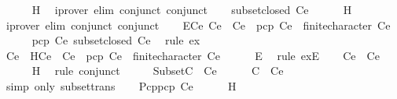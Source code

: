 \begin{isabellebody}
\ \ \ \ \isamarkupfalse%
\ H{}\ \isamarkupfalse%
\ {\isacharparenleft}iprover\ elim{\isacharcolon}\ conjunct{}\ conjunct{}{\isacharparenright}\isanewline
\ \ \isamarkupfalse%
\ {\isachardoublequoteopen}subset{\isacharunderscore}closed\ Ce{\isacharprime}{\isachardoublequoteclose}\isanewline
\ \ \ \ \isamarkupfalse%
\ H{}\ \isamarkupfalse%
\ {\isacharparenleft}iprover\ elim{\isacharcolon}\ conjunct{}\ conjunct{}{\isacharparenright}\isanewline
\ \ \isamarkupfalse%
\ E{}{\isacharcolon}{\isachardoublequoteopen}{\isasymexists}Ce{\isachardot}\ Ce{\isacharprime}\ {\isasymsubseteq}\ Ce\ {\isasymand}\ pcp\ Ce\ {\isasymand}\ finite{\isacharunderscore}character\ Ce{\isachardoublequoteclose}\isanewline
\ \ \ \ \isamarkupfalse%
\ {\isacartoucheopen}pcp\ Ce{\isacharprime}{\isacartoucheclose}\ {\isacartoucheopen}subset{\isacharunderscore}closed\ Ce{\isacharprime}{\isacartoucheclose}\ \isamarkupfalse%
\ {\isacharparenleft}rule\ ex{}{\isacharparenright}\isanewline
\ \ \isamarkupfalse%
\ Ce\ \ H{}{\isacharcolon}{\isachardoublequoteopen}Ce{\isacharprime}\ {\isasymsubseteq}\ Ce\ {\isasymand}\ pcp\ Ce\ {\isasymand}\ finite{\isacharunderscore}character\ Ce{\isachardoublequoteclose}\isanewline
\ \ \ \ \isamarkupfalse%
\ E{}\ \isamarkupfalse%
\ {\isacharparenleft}rule\ exE{\isacharparenright}\isanewline
\ \ \isamarkupfalse%
\ {\isachardoublequoteopen}Ce{\isacharprime}\ {\isasymsubseteq}\ Ce{\isachardoublequoteclose}\isanewline
\ \ \ \ \isamarkupfalse%
\ H{}\ \isamarkupfalse%
\ {\isacharparenleft}rule\ conjunct{}{\isacharparenright}\isanewline
\ \ \isamarkupfalse%
\ \isamarkupfalse%
\ Subset{\isacharcolon}{\isachardoublequoteopen}C\ {\isasymsubseteq}\ Ce{\isachardoublequoteclose}\isanewline
\ \ \ \ \isamarkupfalse%
\ {\isacartoucheopen}C\ {\isasymsubseteq}\ Ce{\isacharprime}{\isacartoucheclose}\ \isamarkupfalse%
\ {\isacharparenleft}simp\ only{\isacharcolon}\ subset{\isacharunderscore}trans{\isacharparenright}\isanewline
\ \ \isamarkupfalse%
\ Pcp{\isacharcolon}{\isachardoublequoteopen}pcp\ Ce{\isachardoublequoteclose}\isanewline
\ \ \ \ \isamarkupfalse%
\ H{}\ \isamarkupfalse%

\end{isabellebody}
